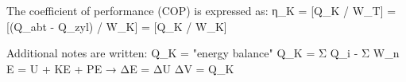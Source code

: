 The coefficient of performance (COP) is expressed as:  
η_K = [Q_K / W_T] = [(Q_abt - Q_zyl) / W_K] = [Q_K / W_K]  

Additional notes are written:  
Q_K = "energy balance"  
Q_K = Σ Q_i - Σ W_n  
E = U + KE + PE → ΔE = ΔU  
ΔV = Q_K
